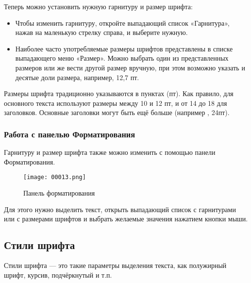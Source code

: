 ﻿\documentclass[a4paper,10pt]{article}
\begin{document}
Теперь можно установить нужную гарнитуру и размер шрифта:
\begin{itemize}
 \item Чтобы изменить гарнитуру, откройте выпадающий список «Гарнитура», нажав на маленькую стрелку справа, и выберите нужную.
 \item Наиболее часто употребляемые размеры шрифтов представлены в списке выпадающего меню «Размер». Можно выбрать один из представленных размеров или же вести другой размер вручную, при этом возможно указать и десятые доли размера, например, 12,7 пт.
\end{itemize}

Размеры шрифта традиционно указываются в пунктах (пт). Как правило, для основного текста используют размеры между 10 и 12 пт, и от 14 до 18 для заголовков. Основные заголовки могут быть ещё больше (например , 24пт).

\subsubsection{Работа с панелью Форматирования}
Гарнитуру и размер шрифта также можно изменить с помощью панели Форматирования.

\begin{figure}[ht]
\texttt{[image: 00013.png]}
\centering
\caption{Панель форматирования}
\end{figure}

Для этого нужно выделить текст, открыть выпадающий список с гарнитурами или с размерами шрифтов и выбрать желаемые значения нажатием кнопки мыши.

\subsection{Стили шрифта}
Стили шрифта — это такие параметры выделения текста, как полужирный шрифт, курсив, подчёркнутый и т.п. 
\end{document}

